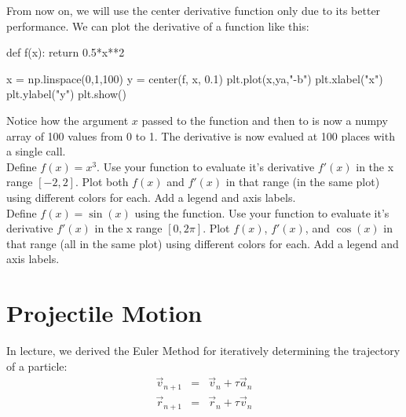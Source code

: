 From now on, we will use the center derivative function only due to
its better performance.  We can plot the derivative of a function like
this:
\begin{python}
def f(x):
    return 0.5*x**2

x = np.linspace(0,1,100)
y = center(f, x, 0.1)
plt.plot(x,ya,"-b")
plt.xlabel("x")
plt.ylabel("y")
plt.show()
\end{python}
Notice how the argument $x$ passed to the function 
and then to  is now a numpy array of 100 values from 0 to
1.  The derivative is now evalued at 100 places with a single call.\\

\plot Define $f(x) = x^3$.  Use your  function to evaluate it's derivative $f'(x)$ in the x range $[-2,2]$.  Plot both $f(x)$ and $f'(x)$ in that range (in the same plot) using different colors for each.  Add a legend and axis labels.\\

\plot Define $f(x) = \sin(x)$ using the  function.  Use
your  function to evaluate it's derivative $f'(x)$ in the
x range $[0,2\pi]$.  Plot $f(x)$, $f'(x)$, and $\cos(x)$ in that range
(all in the same plot) using different colors for each.  Add a legend
and axis labels.\\

\section{Projectile Motion}

In lecture, we derived the Euler Method for iteratively determining the trajectory of a particle:
\begin{eqnarray*}
  \vec{v}_{n+1} &=& \vec{v}_n + \tau \vec{a}_n \\
  \vec{r}_{n+1} &=& \vec{r}_n + \tau \vec{v}_n \\
\end{eqnarray*}

